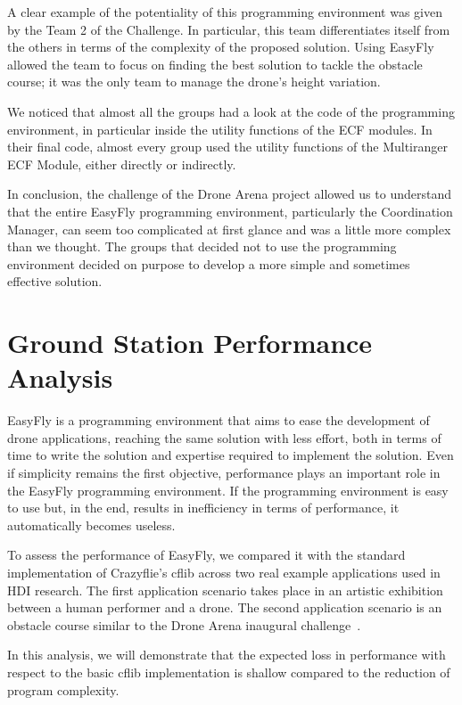 A clear example of the potentiality of this programming environment was given by the Team 2 of the Challenge. 
In particular, this team differentiates itself from the others in terms of the complexity of the proposed solution.
Using EasyFly allowed the team to focus on finding the best solution to tackle the obstacle course; it was the only team to manage the drone's height variation.

We noticed that almost all the groups had a look at the code of the programming environment, in particular inside the utility functions of the ECF modules. 
In their final code, almost every group used the utility functions of the Multiranger ECF Module, either directly or indirectly.

In conclusion, the challenge of the Drone Arena project allowed us to understand that the entire EasyFly programming environment, particularly the Coordination Manager, can seem too complicated at first glance and was a little more complex than we thought.
The groups that decided not to use the programming environment decided on purpose to develop a more simple and sometimes effective solution.

\section{Ground Station Performance Analysis}\label{sec:performance_analysis}

EasyFly is a programming environment that aims to ease the development of drone applications, reaching the same solution with less effort, both in terms of time to write the solution and expertise required to implement the solution.
Even if simplicity remains the first objective, performance plays an important role in the EasyFly programming environment.
If the programming environment is easy to use but, in the end, results in inefficiency in terms of performance, it automatically becomes useless.

To assess the performance of EasyFly, we compared it with the standard implementation of Crazyflie's cflib across two real example applications used in HDI research.
The first application scenario takes place in an artistic exhibition between a human performer and a drone. 
The second application scenario is an obstacle course similar to the Drone Arena inaugural challenge~\cite{dronearenaChallenge}.

In this analysis, we will demonstrate that the expected loss in performance with respect to the basic cflib implementation is shallow compared to the reduction of program complexity.

